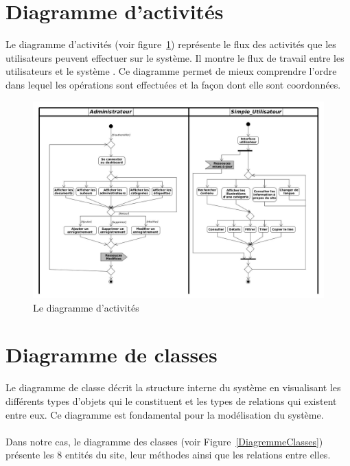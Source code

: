			
	\section{Diagramme d'activit\'es}
		Le diagramme d'activit\'es (voir figure~\ref{DiagrammeDActivite}) repr\'esente le flux des activit\'es que les utilisateurs peuvent effectuer sur le syst\`eme. Il montre le flux de travail entre les utilisateurs et le syst\`eme \cite{DiagActivite}. Ce diagramme permet de mieux comprendre l'ordre dans lequel les op\'erations sont effectu\'ees et la fa\c{c}on dont elle sont coordonn\'ees. \\
			
			
			\begin{figure}[!ht]
				\centering
				\includegraphics[width=0.75\linewidth]{Pictures/DiagrammeDActivites.jpg}
				\caption{Le diagramme d'activit\'es}
				\label{DiagrammeDActivite}
			\end{figure}
			
			
			

	\section{Diagramme de classes}

		
		Le diagramme de classe d\'ecrit la structure interne du syst\`eme en visualisant les diff\'erents types d'objets qui le constituent et les types de relations qui existent entre eux. Ce diagramme est fondamental pour la mod\'elisation du syst\`eme.
		
		\paragraph{} Dans notre cas, le diagramme des classes (voir Figure~\ref{DiagremmeClasses}) pr\'esente les 8  entit\'es du site, leur m\'ethodes ainsi que les relations entre elles.
	
